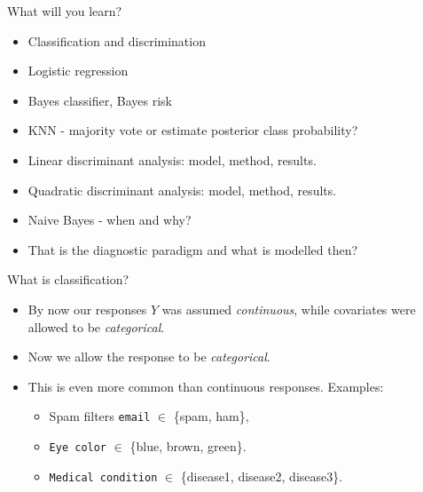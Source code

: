 \documentclass[10pt,ignorenonframetext,]{beamer}
\providecommand{\tightlist}{%
  \setlength{\itemsep}{0pt}\setlength{\parskip}{0pt}}
\begin{document}
\begin{frame}

\begin{block}{What will you learn?}

\begin{itemize}
\item
  Classification and discrimination
\item
  Logistic regression
\item
  Bayes classifier, Bayes risk
\item
  KNN - majority vote or estimate posterior class probability?
\item
  Linear discriminant analysis: model, method, results.
\item
  Quadratic discriminant analysis: model, method, results.
\item
  Naive Bayes - when and why?
\item
  That is the diagnostic paradigm and what is modelled then?
\end{itemize}

\end{block}

\end{frame}

\begin{frame}[fragile]{What is classification?}

\vspace{3mm}

\begin{itemize}
\item
  By now our responses \(Y\) was assumed \emph{continuous}, while
  covariates were allowed to be \emph{categorical}.
\item
  Now we allow the response to be \emph{categorical}.
\item
  This is even more common than continuous responses. Examples:

  \begin{itemize}
  \tightlist
  \item
    Spam filters \texttt{email} \(\in\) \{spam, ham\},
  \item
    \texttt{Eye\ color} \(\in\) \{blue, brown, green\}.
  \item
    \texttt{Medical\ condition} \(\in\) \{disease1, disease2,
    disease3\}.
  \end{itemize}
\end{itemize}

\end{frame}
\end{document}

